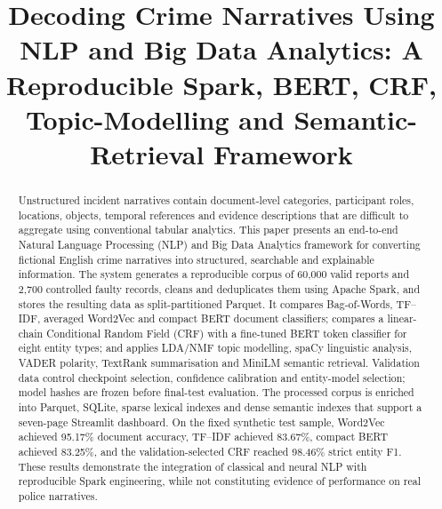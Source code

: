 \documentclass[conference]{IEEEtran}
\begin{document}
\title{Decoding Crime Narratives Using NLP and Big Data Analytics: A Reproducible Spark, BERT, CRF, Topic-Modelling and Semantic-Retrieval Framework}

\author{
\and
{}
\and
{}
\and
{}
}
\maketitle

\begin{abstract}
Unstructured incident narratives contain document-level categories, participant roles, locations, objects, temporal references and evidence descriptions that are difficult to aggregate using conventional tabular analytics. This paper presents an end-to-end Natural Language Processing (NLP) and Big Data Analytics framework for converting fictional English crime narratives into structured, searchable and explainable information. The system generates a reproducible corpus of 60,000 valid reports and 2,700 controlled faulty records, cleans and deduplicates them using Apache Spark, and stores the resulting data as split-partitioned Parquet. It compares Bag-of-Words, TF--IDF, averaged Word2Vec and compact BERT document classifiers; compares a linear-chain Conditional Random Field (CRF) with a fine-tuned BERT token classifier for eight entity types; and applies LDA/NMF topic modelling, spaCy linguistic analysis, VADER polarity, TextRank summarisation and MiniLM semantic retrieval. Validation data control checkpoint selection, confidence calibration and entity-model selection; model hashes are frozen before final-test evaluation. The processed corpus is enriched into Parquet, SQLite, sparse lexical indexes and dense semantic indexes that support a seven-page Streamlit dashboard. On the fixed synthetic test sample, Word2Vec achieved 95.17\% document accuracy, TF--IDF achieved 83.67\%, compact BERT achieved 83.25\%, and the validation-selected CRF reached 98.46\% strict entity F1. These results demonstrate the integration of classical and neural NLP with reproducible Spark engineering, while not constituting evidence of performance on real police narratives.
\end{abstract}
\end{document}
